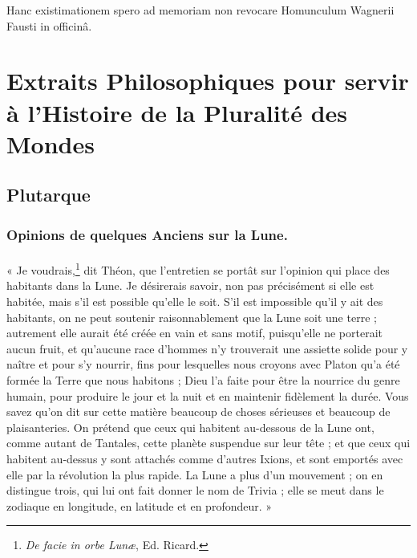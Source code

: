 \documentclass[a4paper, 11pt, oneside, landscape]{article}
\begin{document}
Hanc existimationem spero ad memoriam non revocare Homunculum Wagnerii Fausti in officinâ.
\clearpage
\section{Extraits Philosophiques pour servir à l'Histoire de la Pluralité des Mondes}
\subsection{Plutarque}
\subsubsection{Opinions de quelques Anciens sur la Lune.}
\paragraph{}
« Je voudrais,\footnote{\emph{De facie in orbe Lunæ}, Ed. Ricard.} dit Théon, que l'entretien se portât sur l'opinion qui place des habitants dans la Lune. Je désirerais savoir, non pas précisément si elle est habitée, mais s'il est possible qu'elle le soit. S'il est impossible qu'il y ait des habitants, on ne peut soutenir raisonnablement que la Lune soit une terre ; autrement elle aurait été créée en vain et sans motif, puisqu'elle ne porterait aucun fruit, et qu'aucune race d'hommes n'y trouverait une assiette solide pour y naître et pour s'y nourrir, fins pour lesquelles nous croyons avec Platon qu'a été formée la Terre que nous habitons ; Dieu l'a faite pour être la nourrice du genre humain, pour produire le jour et la nuit et en maintenir fidèlement la durée. Vous savez qu'on dit sur cette matière beaucoup de choses sérieuses et beaucoup de plaisanteries. On prétend que ceux qui habitent au-dessous de la Lune ont, comme autant de Tantales, cette planète suspendue sur leur tête ; et que ceux qui habitent au-dessus y sont attachés comme d'autres Ixions, et sont emportés avec elle par la révolution la plus rapide. La Lune a plus d'un mouvement ; on en distingue trois, qui lui ont fait donner le nom de Trivia ; elle se meut dans le zodiaque en longitude, en latitude et en profondeur. »
\end{document}
